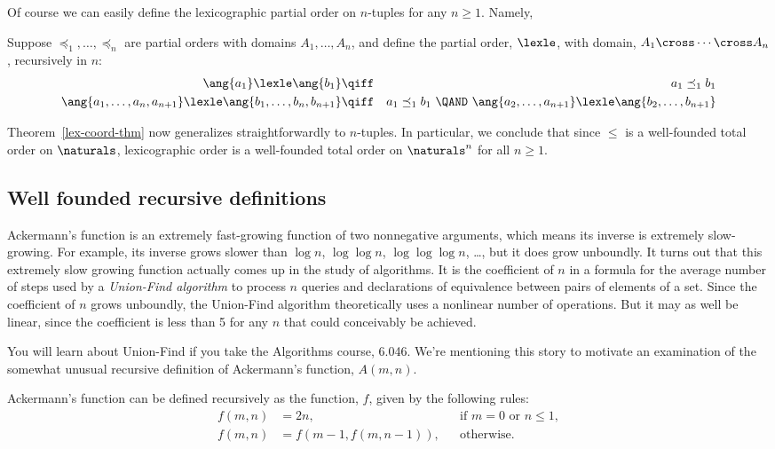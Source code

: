 Of course \iffalse the values of states for the robot in the previous
section were triples not pairs, but\fi
we can easily define the
lexicographic partial order on $n$-tuples for any $n\ge 1$.  Namely,
\begin{definition}\label{lexn}
  Suppose $\preceq_1,\dots, \preceq_n$ are partial orders with domains
  $A_1, \dots, A_n$, and define the partial order, $\lexle$, with domain,
  $A_1 \cross \cdots \cross A_n$, recursively in $n$:
\begin{eqnarray*}
\ang{a_1} \lexle \ang{b_1} &\qiff& a_1 \preceq_1 b_1\\
\ang{a_1,\dots,a_n,a_{n+1}} \lexle \ang{b_1,\dots,b_n,b_{n+1}} &\qiff&
  a_1 \preceq_1 b_1\ \QAND\
    \ang{a_2,\dots,a_{n+1}} \lexle \ang{b_2,\dots,b_{n+1}}
\end{eqnarray*}
\end{definition}
Theorem~\ref{lex-coord-thm} now generalizes straightforwardly to
$n$-tuples.  In particular, we conclude that since $\le$ is a well-founded
total order on $\naturals$, lexicographic order is a well-founded total
order on $\naturals^n$ for all $n \ge 1$.


\subsection{Well founded recursive definitions}

Ackermann's function is an extremely fast-growing function of two
nonnegative arguments, which means its inverse is extremely slow-growing.
For example, its inverse grows slower than $\log n$, $\log \log n$, $\log
\log \log n$, \dots, but it does grow unboundly.  It turns out that this
extremely slow growing function actually comes up in the study of
algorithms.  It is the coefficient of $n$ in a formula for the average
number of steps used by a \emph{Union-Find algorithm} to process $n$
queries and declarations of equivalence between pairs of elements of a
set.  Since the coefficient of $n$ grows unboundly, the Union-Find
algorithm theoretically uses a nonlinear number of operations.  But it may
as well be linear, since the coefficient is less than 5 for any $n$ that
could conceivably be achieved.

You will learn about Union-Find if you take the Algorithms course, 6.046.
We're mentioning this story to motivate an examination of the somewhat
unusual recursive definition of Ackermann's function, $A(m,n)$.

Ackermann's function can be defined recursively as the function, $f$,
given by the following rules:
\begin{align}
f(m,n) &=  2n, &&\text{if $m=0$ or $n \le 1$},\label{Am0}\\ 
f(m,n) &=  f(m-1,f(m,n-1)), &&\text{otherwise}.\label{AA}
\end{align}

